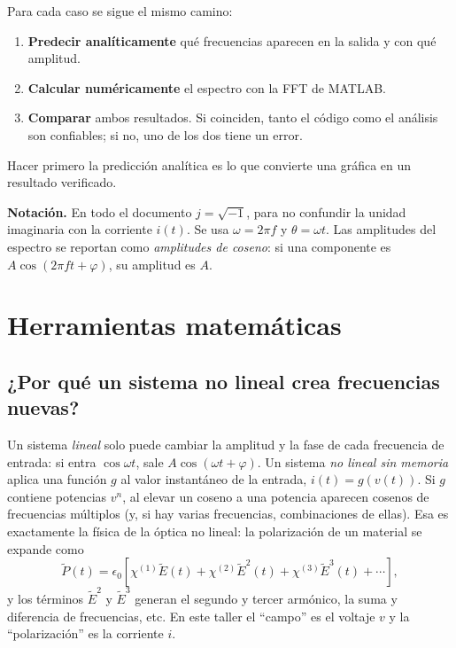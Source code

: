 \documentclass[11pt,letterpaper]{article}
\begin{document}
\begin{idea}
Para cada caso se sigue el mismo camino:
\begin{enumerate}
  \item \textbf{Predecir analíticamente} qué frecuencias aparecen en la salida y con qué amplitud.
  \item \textbf{Calcular numéricamente} el espectro con la FFT de MATLAB.
  \item \textbf{Comparar} ambos resultados. Si coinciden, tanto el código como el análisis son
  confiables; si no, uno de los dos tiene un error.
\end{enumerate}
Hacer primero la predicción analítica es lo que convierte una gráfica en un resultado verificado.
\end{idea}

\textbf{Notación.} En todo el documento $j=\sqrt{-1}$, para no confundir la unidad imaginaria con la
corriente $i(t)$. Se usa $\omega=2\pi f$ y $\theta=\omega t$. Las amplitudes del espectro se reportan
como \emph{amplitudes de coseno}: si una componente es $A\cos(2\pi f t+\varphi)$, su amplitud es $A$.

\section{Herramientas matemáticas}

\subsection{¿Por qué un sistema no lineal crea frecuencias nuevas?}

Un sistema \emph{lineal} solo puede cambiar la amplitud y la fase de cada frecuencia de entrada: si
entra $\cos\omega t$, sale $A\cos(\omega t+\varphi)$. Un sistema \emph{no lineal sin memoria} aplica una
función $g$ al valor instantáneo de la entrada, $i(t)=g(v(t))$. Si $g$ contiene potencias $v^n$, al elevar
un coseno a una potencia aparecen cosenos de frecuencias múltiplos (y, si hay varias frecuencias,
combinaciones de ellas). Esa es exactamente la física de la óptica no lineal: la polarización de un
material se expande como \cite[ec.~(1.1.2), p.~2]{boyd}
\begin{equation}
  \tilde P(t)=\epsilon_0\left[\chi^{(1)}\tilde E(t)+\chi^{(2)}\tilde E^2(t)+\chi^{(3)}\tilde E^3(t)+\cdots\right],
  \label{eq:boyd}
\end{equation}
y los términos $\tilde E^2$ y $\tilde E^3$ generan el segundo y tercer armónico, la suma y diferencia de
frecuencias, etc. En este taller el ``campo'' es el voltaje $v$ y la ``polarización'' es la corriente $i$.
\end{document}
